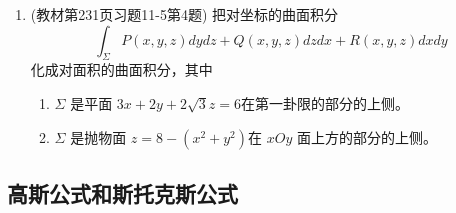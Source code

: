 \begin{enumerate}
    \item (教材第231页习题11-5第4题) 把对坐标的曲面积分
    \[
        \int _\Sigma P(x,y,z) dydz + Q(x,y,z) dzdx + R(x,y,z)dxdy
    \]
    化成对面积的曲面积分，其中
        \begin{enumerate}[(1)]
            \item $\Sigma$ 是平面 $3x + 2y + 2\sqrt{3}z=6$在第一卦限的部分的上侧。
            \item $\Sigma$ 是抛物面 $z =8 - (x^2 + y^2)$在 $xOy$ 面上方的部分的上侧。
        \end{enumerate}
\end{enumerate}

\subsection{高斯公式和斯托克斯公式}
